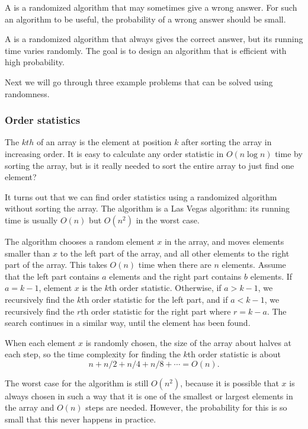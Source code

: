 
A  is a randomized algorithm
that may sometimes give a wrong answer.
For such an algorithm to be useful,
the probability of a wrong answer should be small.


A  is a randomized algorithm
that always gives the correct answer,
but its running time varies randomly.
The goal is to design an algorithm that is
efficient with high probability.

Next we will go through three example problems that
can be solved using randomness.

\subsubsection{Order statistics}


The $kth$  of an array
is the element at position $k$ after sorting
the array in increasing order.
It is easy to calculate any order statistic
in $O(n \log n)$ time by sorting the array,
but is it really needed to sort the entire array
to just find one element?

It turns out that we can find order statistics
using a randomized algorithm without sorting the array.
The algorithm is a Las Vegas algorithm:
its running time is usually $O(n)$
but $O(n^2)$ in the worst case.

The algorithm chooses a random element $x$
in the array, and moves elements smaller than $x$
to the left part of the array,
and all other elements to the right part of the array.
This takes $O(n)$ time when there are $n$ elements.
Assume that the left part contains $a$ elements
and the right part contains $b$ elements.
If $a=k-1$, element $x$ is the $k$th order statistic.
Otherwise, if $a>k-1$, we recursively find the $k$th order
statistic for the left part,
and if $a<k-1$, we recursively find the $r$th order
statistic for the right part where $r=k-a$.
The search continues in a similar way, until the element
has been found.

When each element $x$ is randomly chosen,
the size of the array about halves at each step,
so the time complexity for
finding the $k$th order statistic is about
\[n+n/2+n/4+n/8+\cdots=O(n).\]

The worst case for the algorithm is still $O(n^2)$,
because it is possible that $x$ is always chosen
in such a way that it is one of the smallest or largest
elements in the array and $O(n)$ steps are needed.
However, the probability for this is so small
that this never happens in practice.

